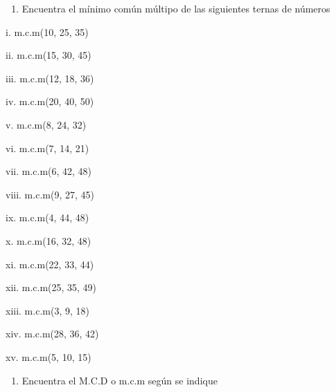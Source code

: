 \documentclass[]{book}
\providecommand{\tightlist}{%
  \setlength{\itemsep}{0pt}\setlength{\parskip}{0pt}}
\begin{document}
\begin{enumerate}
\def\labelenumi{\arabic{enumi}.}
\setcounter{enumi}{3}
\tightlist
\item
  Encuentra el mínimo común múltipo de las siguientes ternas de números
\end{enumerate}

\begin{multicols}{2}
  
    i. m.c.m(10, 25, 35)
  
    ii. m.c.m(15, 30, 45)
  
    iii. m.c.m(12, 18, 36)
  
    iv. m.c.m(20, 40, 50)
  
    v. m.c.m(8, 24, 32)
  
    vi. m.c.m(7, 14, 21)
  
    vii. m.c.m(6, 42, 48)
  
    viii. m.c.m(9, 27, 45)
  
    ix. m.c.m(4, 44, 48)
  
    x. m.c.m(16, 32, 48)
  
    xi. m.c.m(22, 33, 44)
  
    xii. m.c.m(25, 35, 49)
  
    xiii. m.c.m(3, 9, 18)
  
    xiv. m.c.m(28, 36, 42)
  
    xv. m.c.m(5, 10, 15)
\end{multicols}

\begin{enumerate}
\def\labelenumi{\arabic{enumi}.}
\setcounter{enumi}{4}
\tightlist
\item
  Encuentra el M.C.D o m.c.m según se indique
\end{enumerate}
\end{document}

